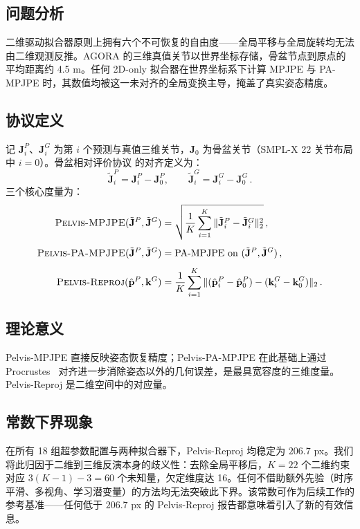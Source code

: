 \documentclass[a4paper,11pt]{article}
\newcommand{\prp}{骨盆相对评价协议}
\begin{document}
\subsection{问题分析}
二维驱动拟合器原则上拥有六个不可恢复的自由度——全局平移与全局旋转均无法由二维观测反推。AGORA 的三维真值关节以世界坐标存储，骨盆节点到原点的平均距离约 4.5 m。任何 2D-only 拟合器在世界坐标系下计算 MPJPE 与 PA-MPJPE 时，其数值均被这一未对齐的全局变换主导，掩盖了真实姿态精度。

\subsection{协议定义}
记 $\mathbf{J}_i^P$、$\mathbf{J}_i^G$ 为第 $i$ 个预测与真值三维关节，$\mathbf{J}_0$ 为骨盆关节（SMPL-X 22 关节布局中 $i=0$）。\prp{} 的对齐定义为：
\begin{equation}
\tilde{\mathbf{J}}_i^P = \mathbf{J}_i^P - \mathbf{J}_0^P,\qquad \tilde{\mathbf{J}}_i^G = \mathbf{J}_i^G - \mathbf{J}_0^G\,.
\end{equation}
三个核心度量为：
\begin{align}
\textsc{Pelvis-MPJPE}(\tilde{\mathbf{J}}^P, \tilde{\mathbf{J}}^G) &= \sqrt{\frac{1}{K}\sum_{i=1}^{K}\|\tilde{\mathbf{J}}_i^P - \tilde{\mathbf{J}}_i^G\|_2^2}\,, \\[4pt]
\textsc{Pelvis-PA-MPJPE}(\tilde{\mathbf{J}}^P, \tilde{\mathbf{J}}^G) &= \text{PA-MPJPE on }(\tilde{\mathbf{J}}^P, \tilde{\mathbf{J}}^G)\,, \\[4pt]
\textsc{Pelvis-Reproj}(\hat{\mathbf{p}}^P, \mathbf{k}^G) &= \frac{1}{K}\sum_{i=1}^{K}\|(\hat{\mathbf{p}}_i^P - \hat{\mathbf{p}}_0^P) - (\mathbf{k}_i^G - \mathbf{k}_0^G)\|_2\,.
\end{align}

\subsection{理论意义}
Pelvis-MPJPE 直接反映姿态恢复精度；Pelvis-PA-MPJPE 在此基础上通过 Procrustes~\cite{Procrustes} 对齐进一步消除姿态以外的几何误差，是最具宽容度的三维度量。Pelvis-Reproj 是二维空间中的对应量。

\subsection{常数下界现象}
在所有 18 组超参数配置与两种拟合器下，Pelvis-Reproj 均稳定为 $206.7$ px。我们将此归因于二维到三维反演本身的歧义性：去除全局平移后，$K=22$ 个二维约束对应 $3(K-1)-3 = 60$ 个未知量，欠定维度达 16。任何不借助额外先验（时序平滑、多视角、学习潜变量）的方法均无法突破此下界。该常数可作为后续工作的参考基准——任何低于 $206.7$ px 的 Pelvis-Reproj 报告都意味着引入了新的有效信息。
\end{document}
